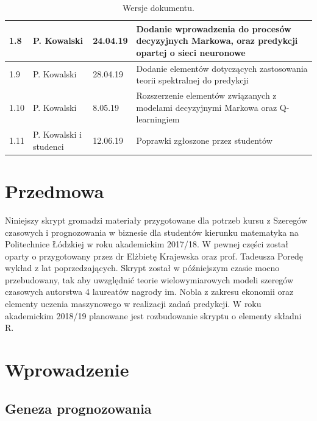 \documentclass[10pt,a4paper]{book}
\begin{document}
\begin{table}[h]
\begin{tabular}{|p{1cm}|p{2cm}|p{12mm}|p{12cm}|}
1.8 & P. Kowalski & 24.04.19 & Dodanie wprowadzenia do procesów decyzyjnych Markowa, oraz predykcji opartej o sieci neuronowe \\\hline
1.9 & P. Kowalski & 28.04.19 & Dodanie elementów dotyczących zastosowania teorii spektralnej do predykcji \\\hline
1.10 & P. Kowalski & 8.05.19 & Rozszerzenie elementów związanych z modelami decyzyjnymi Markowa oraz Q-learningiem \\\hline
1.11 & P. Kowalski i studenci & 12.06.19 & Poprawki zgłoszone przez studentów \\\hline
\end{tabular}
\caption{Wersje dokumentu.}
\end{table}
\FloatBarrier

\chapter*{Przedmowa}

Niniejszy skrypt gromadzi materiały przygotowane dla potrzeb kursu z Szeregów czasowych i prognozowania w biznesie dla studentów kierunku matematyka na Politechnice Łódzkiej w roku akademickim 2017/18. W pewnej części został oparty o przygotowany przez dr Elżbietę Krajewska oraz prof. Tadeusza Poredę wykład z lat poprzedzających. Skrypt został w późniejszym czasie mocno przebudowany, tak aby uwzględnić teorie wielowymiarowych modeli szeregów czasowych autorstwa 4 laureatów nagrody im. Nobla z zakresu ekonomii oraz elementy uczenia maszynowego w realizacji zadań predykcji. W roku akademickim 2018/19 planowane jest rozbudowanie skryptu o elementy składni R. 

\newpage
\tableofcontents

\chapter{Wprowadzenie}

\section{Geneza prognozowania}
\end{document}
